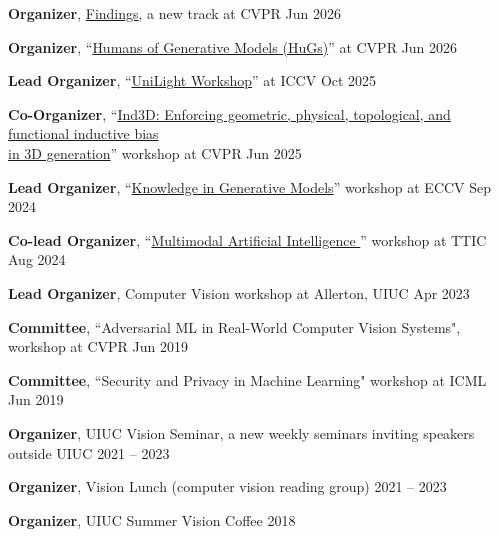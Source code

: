 \begin{list2}
\item {\bf Organizer}, \href{}{Findings}, a new track at CVPR  {\hfill\color{muted} Jun 2026}
\item {\bf Organizer}, ``\href{}{Humans of Generative Models (HuGs)}''  at CVPR  {\hfill\color{muted} Jun 2026}
\item {\bf Lead Organizer}, ``\href{https://unilight-workshop.github.io/unilight2025/}{UniLight Workshop}''  at ICCV  {\hfill\color{muted} Oct 2025}
\item {\bf Co-Organizer}, ``\href{https://ind3dworkshop.github.io/cvpr2025/}{Ind3D: Enforcing geometric, physical, topological, and functional inductive bias \\in 3D generation}'' workshop at CVPR {\hfill\color{muted} Jun 2025}
\item {\bf Lead Organizer}, ``\href{https://sites.google.com/ttic.edu/knowledge-in-generative-models/home}{Knowledge in Generative Models}'' workshop at ECCV {\hfill\color{muted} Sep 2024}
\item {\bf Co-lead Organizer}, ``\href{https://sites.google.com/view/multimodal-ai-ttic-2024/home}{Multimodal Artificial Intelligence
}'' workshop at TTIC {\hfill\color{muted} Aug 2024}
\item {\bf Lead Organizer}, Computer Vision workshop at Allerton, UIUC {\hfill\color{muted} Apr 2023}
\item {\bf Committee}, ``Adversarial ML in Real-World Computer Vision Systems", workshop at CVPR {\hfill\color{muted} Jun 2019}
\item {\bf Committee}, ``Security and Privacy in Machine Learning" workshop at ICML  {\hfill\color{muted} Jun 2019} 
\end{list2}
\vspace{2ex}
\begin{list2}
\item {\bf Organizer}, UIUC Vision Seminar, a new weekly seminars inviting speakers outside UIUC {\hfill\color{muted} 2021 -- 2023}
\item {\bf Organizer}, Vision Lunch (computer vision reading group) {\hfill\color{muted} 2021 -- 2023}
\item {\bf Organizer}, UIUC Summer Vision Coffee{\hfill\color{muted} 2018}
\end{list2}
\vspace{1ex}



